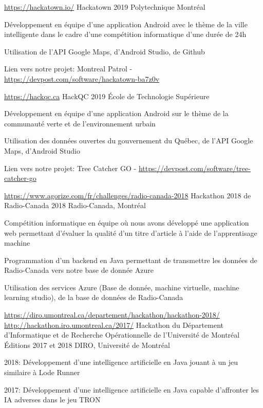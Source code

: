 \begin{cventries}
  \cventry
  {\url{https://hackatown.io/}}
    {Hackatown}
    {2019}
    {Polytechnique Montréal}
    {
      \begin{cvitems}
      \item {Développement en équipe d'une application Android avec le thème de la ville intelligente dans le cadre d'une compétition informatique d'une durée de 24h}
      \item{Utilisation de l'API Google Maps, d'Android Studio, de Github}
        \item {Lien vers notre projet: Montreal Patrol - \url{https://devpost.com/software/hackatown-ba7z0v}}
      \end{cvitems}
    }
  \cventry
  {\url{https://hackqc.ca}}
    {HackQC}
    {2019}
    {École de Technologie Supérieure}
    {
      \begin{cvitems}
      \item{Développement en équipe d'une application Android sur le thème de la communauté verte et de l'environnement urbain}
      \item{Utilisation des données ouvertes du gouvernement du Québec, de l'API Google Maps, d'Android Studio} 
        \item{Lien vers notre projet: Tree Catcher GO - \url{https://devpost.com/software/tree-catcher-go}}
      \end{cvitems}
    }
  \cventry
  {\url{https://www.agorize.com/fr/challenges/radio-canada-2018}}
  {Hackathon 2018 de Radio-Canada}
    {2018}
    {Radio-Canada, Montréal}
    {
      \begin{cvitems}
      \item{Compétition informatique en équipe où nous avons développé une application web permettant d'évaluer la qualité d'un titre d'article à l'aide de l'apprentisage machine}
      \item{Programmation d'un backend en Java permettant de transmettre les données de Radio-Canada vers notre base de donnée Azure}
      \item{Utilisation des services Azure (Base de donnée, machine virtuelle, machine learning studio), de la base de données de Radio-Canada}
      \end{cvitems}
    }
    \cventry
  {
\url{https://diro.umontreal.ca/departement/hackathon/hackathon-2018/}
  \url{http://hackathon.iro.umontreal.ca/2017/}
}
  {Hackathon du Département d'Informatique et de Recherche Opérationnelle de l'Université de Montréal}
    {Éditions 2017 et 2018}
    {DIRO, Université de Montréal}
    {
      \begin{cvitems}
      \item{2018: Développement d'une intelligence artificielle en Java jouant à un jeu similaire à Lode Runner}
      \item{2017: Développement d'une intelligence artificielle en Java capable d'affronter les IA adverses dans le jeu TRON}
      \end{cvitems}
    }
\end{cventries}
